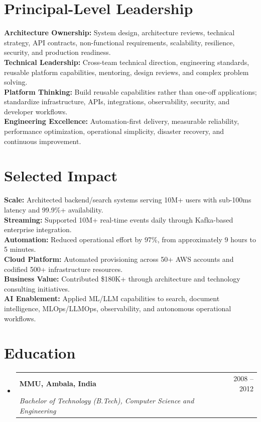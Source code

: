 \documentclass[letterpaper,10.5pt]{article}
\makeatletter
\newcommand{\resumeSubheading}[4]{
  \vspace{-2pt}\item
  \begin{tabular*}{0.97\textwidth}[t]{l@{\extracolsep{\fill}}r}
    \textbf{#1} & #2 \\
    \textit{\small#3} & \textit{\small #4} \\
  \end{tabular*}\vspace{-7pt}
}
\newcommand{\resumeSubHeadingListStart}{\begin{itemize}[leftmargin=0.15in, label={}]}
\newcommand{\resumeSubHeadingListEnd}{\end{itemize}}
\makeatother
\begin{document}
\section{Principal-Level Leadership}
\begin{itemize}[leftmargin=0.15in, label={}]
\small{\item{
\textbf{Architecture Ownership:} System design, architecture reviews, technical strategy, API contracts, non-functional requirements, scalability, resilience, security, and production readiness. \\
\textbf{Technical Leadership:} Cross-team technical direction, engineering standards, reusable platform capabilities, mentoring, design reviews, and complex problem solving. \\
\textbf{Platform Thinking:} Build reusable capabilities rather than one-off applications; standardize infrastructure, APIs, integrations, observability, security, and developer workflows. \\
\textbf{Engineering Excellence:} Automation-first delivery, measurable reliability, performance optimization, operational simplicity, disaster recovery, and continuous improvement.
}}
\end{itemize}

\section{Selected Impact}
\begin{itemize}[leftmargin=0.15in, label={}]
\small{\item{
\textbf{Scale:} Architected backend/search systems serving 10M+ users with sub-100ms latency and 99.9\%+ availability. \\
\textbf{Streaming:} Supported 10M+ real-time events daily through Kafka-based enterprise integration. \\
\textbf{Automation:} Reduced operational effort by 97\%, from approximately 9 hours to 5 minutes. \\
\textbf{Cloud Platform:} Automated provisioning across 50+ AWS accounts and codified 500+ infrastructure resources. \\
\textbf{Business Value:} Contributed \$180K+ through architecture and technology consulting initiatives. \\
\textbf{AI Enablement:} Applied ML/LLM capabilities to search, document intelligence, MLOps/LLMOps, observability, and autonomous operational workflows.
}}
\end{itemize}

\section{Education}
\resumeSubHeadingListStart
\resumeSubheading
  {MMU, Ambala, India}{2008 -- 2012}
  {Bachelor of Technology (B.Tech), Computer Science and Engineering}{}
\resumeSubHeadingListEnd
\end{document}
